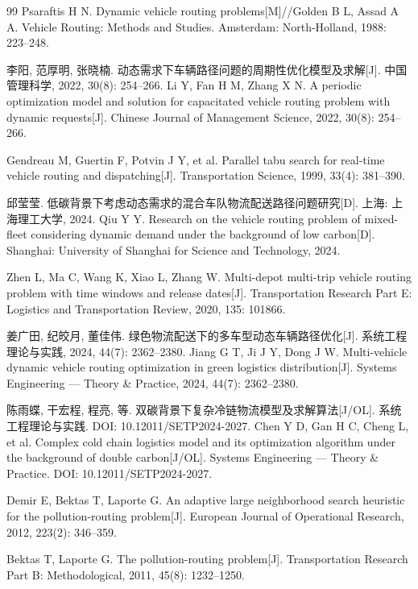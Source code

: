\documentclass{setp-new}
\begin{document}
\begin{thebibliography}{99}
 Psaraftis H N. Dynamic vehicle routing problems[M]//Golden B L, Assad A A. Vehicle Routing: Methods and Studies. Amsterdam: North-Holland, 1988: 223--248.

 李阳, 范厚明, 张晓楠. 动态需求下车辆路径问题的周期性优化模型及求解[J]. 中国管理科学, 2022, 30(8): 254--266.\newline
Li Y, Fan H M, Zhang X N. A periodic optimization model and solution for capacitated vehicle routing problem with dynamic requests[J]. Chinese Journal of Management Science, 2022, 30(8): 254--266.

 Gendreau M, Guertin F, Potvin J Y, et al. Parallel tabu search for real-time vehicle routing and dispatching[J]. Transportation Science, 1999, 33(4): 381--390.

 邱莹莹. 低碳背景下考虑动态需求的混合车队物流配送路径问题研究[D]. 上海: 上海理工大学, 2024.\newline
Qiu Y Y. Research on the vehicle routing problem of mixed-fleet considering dynamic demand under the background of low carbon[D]. Shanghai: University of Shanghai for Science and Technology, 2024.

 Zhen L, Ma C, Wang K, Xiao L, Zhang W. Multi-depot multi-trip vehicle routing problem with time windows and release dates[J]. Transportation Research Part E: Logistics and Transportation Review, 2020, 135: 101866.

 姜广田, 纪皎月, 董佳伟. 绿色物流配送下的多车型动态车辆路径优化[J]. 系统工程理论与实践, 2024, 44(7): 2362--2380.\newline
Jiang G T, Ji J Y, Dong J W. Multi-vehicle dynamic vehicle routing optimization in green logistics distribution[J]. Systems Engineering --- Theory \& Practice, 2024, 44(7): 2362--2380.

 陈雨蝶, 干宏程, 程亮, 等. 双碳背景下复杂冷链物流模型及求解算法[J/OL]. 系统工程理论与实践. DOI: 10.12011/SETP2024-2027.\newline
Chen Y D, Gan H C, Cheng L, et al. Complex cold chain logistics model and its optimization algorithm under the background of double carbon[J/OL]. Systems Engineering --- Theory \& Practice. DOI: 10.12011/SETP2024-2027.

 Demir E, Bektas T, Laporte G. An adaptive large neighborhood search heuristic for the pollution-routing problem[J]. European Journal of Operational Research, 2012, 223(2): 346--359.

 Bektas T, Laporte G. The pollution-routing problem[J]. Transportation Research Part B: Methodological, 2011, 45(8): 1232--1250.


\end{thebibliography}
\end{document}

